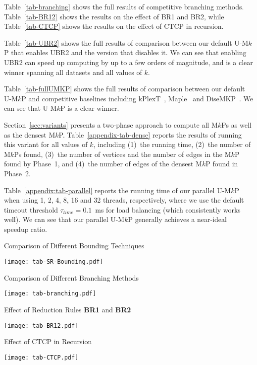 \documentclass[sigconf, nonacm]{acmart}
\begin{document}
Table~\ref{tab-branching} shows the full results of competitive branching methods. Table~\ref{tab-BR12} shows the results on the effect of BR1 and BR2, while Table~\ref{tab-CTCP} shows the results on the effect of CTCP in recursion.  

Table~\ref{tab-UBR2} shows the full results of comparison between our default U-M$k$P that enables UBR2 and the version that disables it. We can see that enabling UBR2 can speed up computing by up to a few orders of magnitude, and is a clear winner spanning all datasets and all values of $k$.

Table~\ref{tab-fullUMKP} shows the full results of comparison between our default U-M$k$P and competitive baselines including kPlexT~\cite{kPlexT}, Maple~\cite{Maple} and DiseMKP~\cite{DiseMKP}. We can see that U-M$k$P is a clear winner.

Section~\ref{sec:variants} presents a two-phase approach to compute all M$k$Ps as well as the densest M$k$P. Table~\ref{appendix-tab-dense} reports the results of running this variant for all values of $k$, including (1)~the running time, (2)~the number of M$k$Ps found, (3)~the number of vertices and the number of edges in the M$k$P found by Phase~1, and (4)~the number of edges of the densest M$k$P found in Phase~2.

Table~\ref{appendix:tab-parallel} reports the running time of our parallel U-M$k$P when using 1, 2, 4, 8, 16 and 32 threads, respectively, where we use the default timeout threshold $\tau_{time}=0.1$~ms for load balancing (which consistently works well). We can see that our parallel U-M$k$P generally achieves a near-ideal speedup ratio. 

\begin{table*}
  \caption{Comparison of Different Bounding Techniques}\label{tab-SR-Bounding}
  \texttt{[image: tab-SR-Bounding.pdf]}
\end{table*}

\begin{table*}
  \caption{Comparison of Different Branching Methods}\label{tab-branching}
  \texttt{[image: tab-branching.pdf]}
\end{table*}

\begin{table*}
  \caption{Effect of Reduction Rules \textbf{BR1} and \textbf{BR2}}\label{tab-BR12}
  \texttt{[image: tab-BR12.pdf]}
\end{table*}

\begin{table*}
  \caption{Effect of CTCP in Recursion}\label{tab-CTCP}
  \texttt{[image: tab-CTCP.pdf]}
\end{table*}
\end{document}

